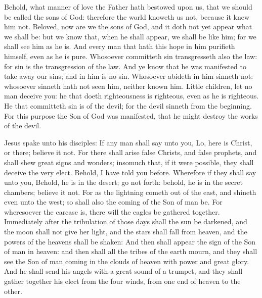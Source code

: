  Behold, what manner of love the Father hath bestowed upon us, that we should be called the sons of God: therefore the world knoweth us not, because it knew him not. Beloved, now are we the sons of God, and it doth not yet appear what we shall be: but we know that, when he shall appear, we shall be like him; for we shall see him as he is. And every man that hath this hope in him purifieth himself, even as he is pure. Whosoever committeth sin transgresseth also the law: for sin is the transgression of the law. And ye know that he was manifested to take away our sins; and in him is no sin. Whosoever abideth in him sinneth not: whosoever sinneth hath not seen him, neither known him. Little children, let no man deceive you: he that doeth righteousness is righteous, even as he is righteous. He that committeth sin is of the devil; for the devil sinneth from the beginning. For this purpose the Son of God was manifested, that he might destroy the works of the devil.


\vspace{-0.4\baselineskip}


\vspace{-0.1\baselineskip}

 Jesus spake unto his disciples: If any man shall say unto you, Lo, here is Christ, or there; believe it not. For there shall arise false Christs, and false prophets, and shall shew great signs and wonders; insomuch that, if it were possible, they shall deceive the very elect. Behold, I have told you before. Wherefore if they shall say unto you, Behold, he is in the desert; go not forth: behold, he is in the secret chambers; believe it not. For as the lightning cometh out of the east, and shineth even unto the west; so shall also the coming of the Son of man be. For wheresoever the carcase is, there will the eagles be gathered together. Immediately after the tribulation of those days shall the sun be darkened, and the moon shall not give her light, and the stars shall fall from heaven, and the powers of the heavens shall be shaken: And then shall appear the sign of the Son of man in heaven: and then shall all the tribes of the earth mourn, and they shall see the Son of man coming in the clouds of heaven with power and great glory. And he shall send his angels with a great sound of a trumpet, and they shall gather together his elect from the four winds, from one end of heaven to the other.

